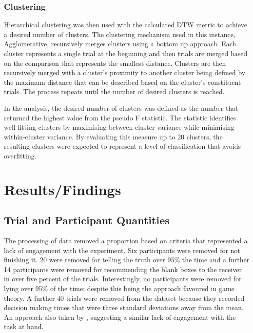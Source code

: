 \documentclass[man, floatsintext]{apa7}
\begin{document}
\subsubsection{Clustering}

Hierarchical clustering was then used with the calculated DTW metric to achieve a desired number of clusters. The clustering mechanism used in this instance, Agglomerative, recursively merges clusters using a bottom up approach. Each cluster represents a single trial at the beginning and then trials are merged based on the comparison that represents the smallest distance. Clusters are then recursively merged with a cluster's proximity to another cluster being defined by the maximum distance that can be described based on the cluster's constituent trials. The process repeats until the number of desired clusters is reached.

In the analysis, the desired number of clusters was defined as the number that returned the highest value from the pseudo F statistic. The statistic identifies well-fitting clusters by maximising between-cluster variance while minimising within-cluster variance. By evaluating this measure up to 20 clusters, the resulting clusters were expected to represent a level of classification that avoids overfitting.



\section{Results/Findings}

\subsection{Trial and Participant Quantities}
\label{subsec:quantities}
The processing of data removed a proportion based on criteria that represented a lack of engagement with the experiment. Six participants were removed for not finishing it. 20 were removed for telling the truth over 95\% the time and a further 14 participants were removed for recommending the blank boxes to the receiver in over five percent of the trials.  Interestingly, no participants were removed for lying over 95\% of the time; despite this being the approach favoured in game theory.  A further 40 trials were removed from the dataset because they recorded decision making times that were three standard deviations away from the mean. An approach also taken by \citeauthor{reeckSearchPredictsChanges2017b}, suggesting a similar lack of engagement with the task at hand.
\end{document}

